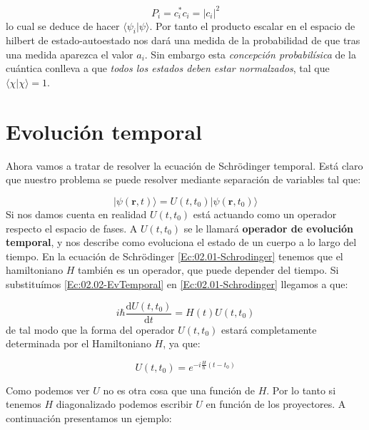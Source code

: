 \documentclass[12pt,a4paper]{book}
\numberwithin{equation}{chapter}
\numberwithin{figure}{chapter}
\newcommand{\D}{\mathrm{d}}
\newcommand{\derivadas}[2]{\frac{\D #1}{\D #2}}
\newcommand{\rn}{\mathbf{r}}
\begin{document}
\begin{equation}
P_i = c_i ^* c_i = |c_i|^2
\end{equation}
lo cual se deduce de hacer $\langle \psi_i | \psi \rangle$. Por tanto el producto escalar en el espacio de hilbert de estado-autoestado nos dará una medida de la probabilidad de que tras una medida aparezca el valor $a_i$. Sin embargo esta \textit{concepción probabilísica} de la cuántica conlleva a que \textit{todos los estados deben estar normalzados}, tal que $\langle \chi | \chi \rangle = 1$. 


\section{Evolución temporal}
Ahora vamos a tratar de resolver la ecuación de Schrödinger temporal. Está claro que nuestro problema se puede resolver mediante separación de variables tal que:

\begin{equation}
| \psi (\rn,t) \rangle = U(t,t_0) |\psi (\rn,t_0) \rangle \label{Ec:02.02-EvTemporal}
\end{equation}
Si nos damos cuenta en realidad $U(t,t_0)$ está actuando como un operador respecto el espacio de fases. A $U(t,t_0)$ se le llamará \textbf{operador de evolución temporal}, y nos describe como evoluciona el estado de un cuerpo a lo largo del tiempo. En la ecuación de Schrödinger \ref{Ec:02.01-Schrodinger} tenemos que el hamiltoniano $H$ también es un operador, que puede depender del tiempo. Si substituímos \ref{Ec:02.02-EvTemporal} en \ref{Ec:02.01-Schrodinger} llegamos a que:

\begin{equation}
i \hbar \derivadas{U(t,t_0)}{t} = H(t) U(t,t_0)
\end{equation}
de tal modo que la forma del operador $U(t,t_0)$ estará completamente determinada por el Hamiltoniano $H$, ya que:

\begin{equation}
U(t,t_0) = e^{- i \frac{H}{\hbar} (t-t_0 ) } 
\end{equation}

Como podemos ver $U$ no es otra cosa que una función de $H$. Por lo tanto si tenemos $H$ diagonalizado podemos escribir $U$ en función de los proyectores. A continuación presentamos un ejemplo: \\


\hrulefill
\end{document}
